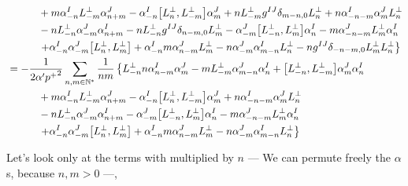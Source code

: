 \begin{align*}
    &\quad\quad\quad+m\alpha^I_{-n}L^\perp_{-m}\alpha^J_{n+m}-\alpha^I_{-n}\comm{L^\perp_n}{L^\perp_{-m}}\alpha^J_m+nL^\perp_{-m}g^{IJ}\delta_{m-n,0}L^\perp_n+n\alpha^I_{-n-m}\alpha^J_mL^\perp_n\\
    &\quad\quad\quad-nL^\perp_{-n}\alpha^J_{-m}\alpha^I_{n+m}-nL^\perp_{-n}g^{IJ}\delta_{n-m,0}L^\perp_m-\alpha^J_{-m}\comm{L^\perp_{-n}}{L^\perp_m}\alpha^I_n-m\alpha^J_{-n-m}L^\perp_m\alpha^I_n\\
    &\quad\quad\quad\left.+\alpha^I_{-n}\alpha^J_{-m}\comm{L^\perp_n}{L^\perp_m}+\alpha^I_{-n}m\alpha^J_{n-m}L^\perp_m-n\alpha^J_{-m}\alpha^I_{m-n}L^\perp_n-ng^{IJ}\delta_{-n-m,0}L^\perp_mL^\perp_n\right\}\\
    &=-\frac{1}{2\alpha'{p^+}^2}\sum\limits_{n,m\in\mathbb N^\ast}\frac{1}{nm}\left\{L^\perp_{-n}n\alpha^I_{n-m}\alpha^J_m-mL^\perp_{-m}\alpha^J_{m-n}\alpha^I_n+\comm{L^\perp_{-n}}{L^\perp_{-m}}\alpha^J_m\alpha^I_n\right.\\
    &\quad\quad\quad+m\alpha^I_{-n}L^\perp_{-m}\alpha^J_{n+m}-\alpha^I_{-n}\comm{L^\perp_n}{L^\perp_{-m}}\alpha^J_m+n\alpha^I_{-n-m}\alpha^J_mL^\perp_n\\
    &\quad\quad\quad-nL^\perp_{-n}\alpha^J_{-m}\alpha^I_{n+m}-\alpha^J_{-m}\comm{L^\perp_{-n}}{L^\perp_m}\alpha^I_n-m\alpha^J_{-n-m}L^\perp_m\alpha^I_n\\
    &\quad\quad\quad\left.+\alpha^I_{-n}\alpha^J_{-m}\comm{L^\perp_n}{L^\perp_m}+\alpha^I_{-n}m\alpha^J_{n-m}L^\perp_m-n\alpha^J_{-m}\alpha^I_{m-n}L^\perp_n\right\}
\end{align*}

Let's look only at the terms with multiplied by $n$ --- We can permute freely the $\alpha$s, because $n,m>0$ ---,

